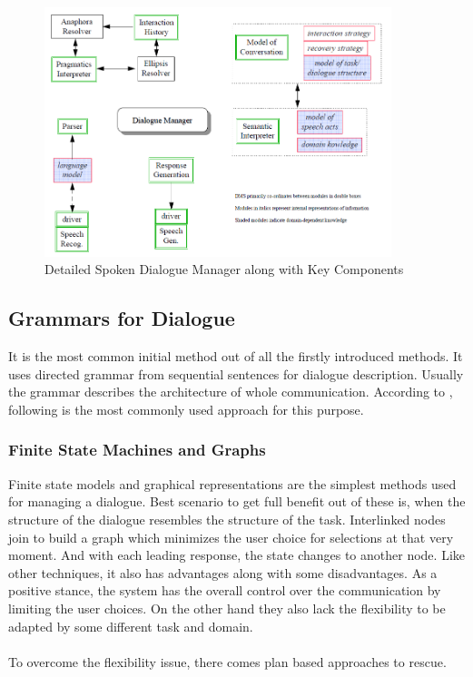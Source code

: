 \begin{figure}[h]
    \centering
    \includegraphics[width=0.9\textwidth]{img/Detailed_Spoken_Dialogue_Manager.PNG}
    \caption{Detailed Spoken Dialogue Manager along with Key Components \cite{dialoguemanagementsystems}}
    \label{fig:dsdm}
\end{figure}

\subsection{Grammars for Dialogue} 
It is the most common initial method out of all the firstly introduced methods. It uses directed grammar from sequential sentences for dialogue description. Usually the grammar describes the architecture of whole communication. According to \cite{dialoguemanagementsystems}, following is the most commonly used approach for this purpose. 

\subsubsection*{Finite State Machines and Graphs}
Finite state models and graphical representations are the simplest methods used for managing a dialogue. Best scenario to get full benefit out of these is, when the structure of the dialogue resembles the structure of the task. Interlinked nodes join to build a graph which minimizes the user choice for selections at that very moment. And with each leading response, the state changes to another node. Like other techniques, it also has advantages along with some disadvantages. As a positive stance, the system has the overall control over the communication by limiting the user choices. On the other hand they also lack the flexibility  to be adapted by some different task and domain. \cite{dialoguemanagementsystems} 
\\~\\
To overcome the flexibility issue, there comes plan based approaches to rescue.

